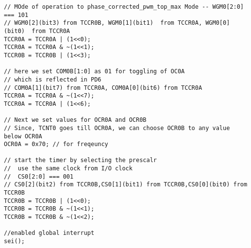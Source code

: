 \begin{verbatim}
// MOde of operation to phase_corrected_pwm_top_max Mode -- WGM0[2:0] === 101
// WGM0[2](bit3) from TCCR0B, WGM0[1](bit1)  from TCCR0A, WGM0[0](bit0)  from TCCR0A
TCCR0A = TCCR0A | (1<<0);
TCCR0A = TCCR0A & ~(1<<1);
TCCR0B = TCCR0B | (1<<3);	

// here we set COM0B[1:0] as 01 for toggling of OC0A
// which is reflected in PD6
// COM0A[1](bit7) from TCCR0A, COM0A[0](bit6) from TCCR0A
TCCR0A = TCCR0A & ~(1<<7);
TCCR0A = TCCR0A | (1<<6);

// Next we set values for OCR0A and OCR0B
// Since, TCNT0 goes till OCR0A, we can choose OCR0B to any value below OCR0A
OCR0A = 0x70; // for freqeuncy

// start the timer by selecting the prescalr
//  use the same clock from I/O clock
//  CS0[2:0] === 001
// CS0[2](bit2) from TCCR0B,CS0[1](bit1) from TCCR0B,CS0[0](bit0) from TCCR0B
TCCR0B = TCCR0B | (1<<0);
TCCR0B = TCCR0B & ~(1<<1);
TCCR0B = TCCR0B & ~(1<<2);

//enabled global interrupt
sei();
\end{verbatim}

